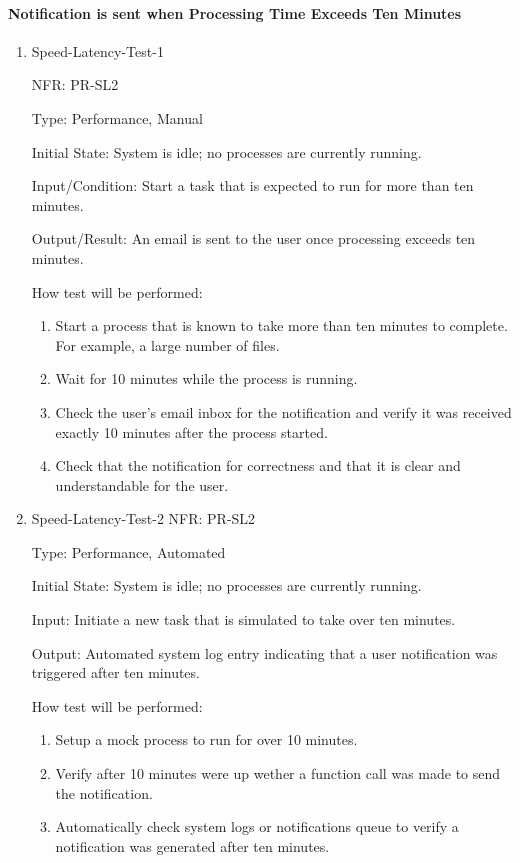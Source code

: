 \documentclass[12pt, titlepage]{article}
\begin{document}
\paragraph{Notification is sent when Processing Time Exceeds Ten Minutes}
\begin{enumerate}
  \item{Speed-Latency-Test-1}

  NFR: PR-SL2

  Type: Performance, Manual
            
  Initial State: System is idle; no processes are currently running.
            
  Input/Condition: Start a task that is expected to run for more than ten minutes.
            
  Output/Result: An email is sent to the user once processing exceeds ten minutes.
            
  How test will be performed: 
  \begin{enumerate}
    \item Start a process that is known to take more than ten minutes to complete. For example, a large number of files.
    \item Wait for 10 minutes while the process is running.
    \item Check the user's email inbox for the notification and verify it was received exactly 10 minutes after the process started.
    \item Check that the notification for correctness and that it is clear and understandable for the user.
  \end{enumerate}

  \item{Speed-Latency-Test-2}
  NFR: PR-SL2

  Type: Performance, Automated
            
  Initial State: System is idle; no processes are currently running.
            
  Input: Initiate a new task that is simulated to take over ten minutes.
            
  Output: Automated system log entry indicating that a user notification was triggered after ten minutes.
            
  How test will be performed: 
  \begin{enumerate}
    \item {Setup a mock process to run for over 10 minutes.}
    \item {Verify after 10 minutes were up wether a function call was made to send the notification.}
    \item {Automatically check system logs or notifications queue to verify a notification was generated after ten minutes.}
  \end{enumerate}
\end{enumerate}
\end{document}
